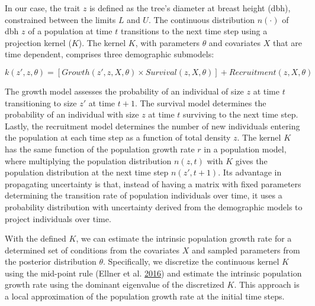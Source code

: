 \documentclass[12pt]{article}
\begin{document}
In our case, the trait \(z\) is defined as the tree's diameter at breast
height (dbh), constrained between the limits \(L\) and \(U\). The
continuous distribution \(n(\cdot)\) of dbh \(z\) of a population at
time \(t\) transitions to the next time step using a projection kernel
(\(K\)). The kernel \(K\), with parameters \(\theta\) and covariates
\(X\) that are time dependent, comprises three demographic submodels:

\begin{equation}
k(z', z, \theta) = [Growth(z', z, X, \theta) \times Survival(z, X, \theta)] + Recruitment(z, X, \theta)
\label{eq:kernel}\end{equation}

The growth model assesses the probability of an individual of size \(z\)
at time \(t\) transitioning to size \(z'\) at time \(t+1\). The survival
model determines the probability of an individual with size \(z\) at
time \(t\) surviving to the next time step. Lastly, the recruitment
model determines the number of new individuals entering the population
at each time step as a function of total density \(z\). The kernel \(K\)
has the same function of the population growth rate \(r\) in a
population model, where multiplying the population distribution
\(n(z, t)\) with \(K\) gives the population distribution at the next
time step \(n(z', t+1)\). Its advantage in propagating uncertainty is
that, instead of having a matrix with fixed parameters determining the
transition rate of population individuals over time, it uses a
probability distribution with uncertainty derived from the demographic
models to project individuals over time.

With the defined \(K\), we can estimate the intrinsic population growth
rate for a determined set of conditions from the covariates \(X\) and
sampled parameters from the posterior distribution \(\theta\).
Specifically, we discretize the continuous kernel \(K\) using the
mid-point rule (Ellner et al. \protect\hyperlink{ref-Ellner2016}{2016})
and estimate the intrinsic population growth rate using the dominant
eigenvalue of the discretized \(K\). This approach is a local
approximation of the population growth rate at the initial time steps.
\end{document}
